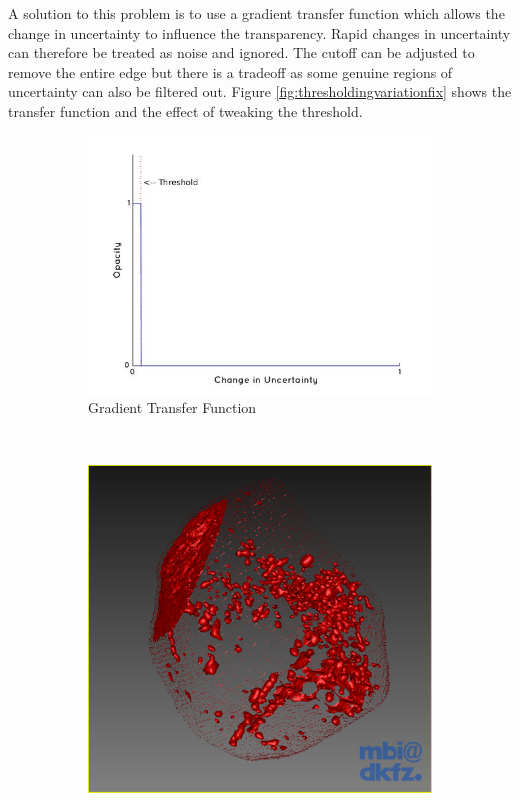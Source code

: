 A solution to this problem is to use a gradient transfer function which allows the change in uncertainty to influence the transparency. Rapid changes in uncertainty can therefore be treated as noise and ignored. The cutoff can be adjusted to remove the entire edge but there is a tradeoff as some genuine regions of uncertainty can also be filtered out. Figure \ref{fig:thresholdingvariationfix} shows the transfer function and the effect of tweaking the threshold.

\begin{figure}[H]
  \centering
  \begin{subfigure}[b]{0.5\textwidth}
    \includegraphics[width=\textwidth]{images/thresholding/thresholdvariation1fix.jpg}
    \caption{Gradient Transfer Function}
    \label{fig:thresholdvariation1fix}
  \end{subfigure}%
  ~ %
  \begin{subfigure}[b]{0.5\textwidth}
    \includegraphics[width=\textwidth]{images/thresholding/thresholdvariation1threshold1.png}

\end{subfigure}
\end{figure}
